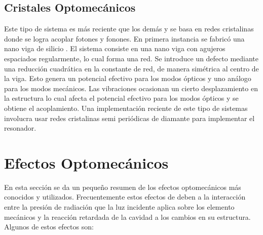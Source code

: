 \documentclass[10pt,a4paper]{report}
\begin{document}
\subsection{Cristales Optomecánicos}

Este tipo de sistema es más reciente que los demás y se basa en redes cristalinas donde se logra acoplar fotones y fonones. En primera instancia se fabricó una nano viga de silicio  \cite{EichenfieldOC}. El sistema consiste en una nano viga con agujeros espaciados regularmente, lo cual forma una red. Se introduce un defecto mediante una reducción cuadrática en la constante de red, de manera simétrica al centro de la viga. Esto genera un potencial efectivo para los modos ópticos y uno análogo para los modos mecánicos. Las vibraciones ocasionan un cierto desplazamiento en la estructura lo cual afecta el potencial efectivo para los modos ópticos y se obtiene el acoplamiento. Una implementación reciente de este tipo de sistemas involucra usar redes cristalinas semi periódicas de diamante para implementar el resonador\cite{BurekDO}.

\section{Efectos Optomecánicos}

En esta sección se da un pequeño resumen de los efectos optomecánicos más conocidos y utilizados. Frecuentemente estos efectos de deben a la interacción entre la presión de radiación que la luz incidente aplica sobre los elemento mecánicos y la reacción retardada de la cavidad a los cambios en su estructura. Algunos de estos efectos son:
\end{document}
